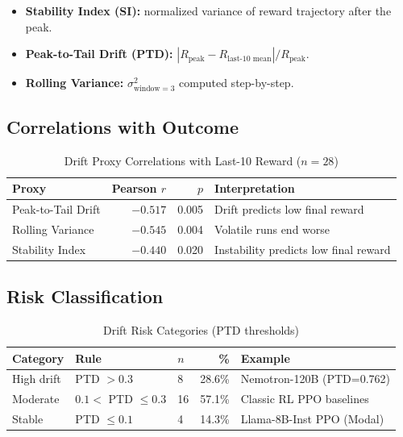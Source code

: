 \documentclass[12pt,a4paper]{report}
\theoremstyle{definition}
\begin{document}
\begin{itemize}[nosep]
\item \textbf{Stability Index (SI):} normalized variance of reward trajectory after the peak.
\item \textbf{Peak-to-Tail Drift (PTD):} $|R_{\text{peak}} - R_{\text{last-10 mean}}| / R_{\text{peak}}$.
\item \textbf{Rolling Variance:} $\sigma^2_{\text{window}=3}$ computed step-by-step.
\end{itemize}

\subsection{Correlations with Outcome}

\begin{table}[htbp]
\centering
\caption{Drift Proxy Correlations with Last-10 Reward ($n=28$)}
\label{tab:drift-corr}
\begin{tabular}{lrrl}
\toprule
\textbf{Proxy} & \textbf{Pearson $r$} & \textbf{$p$} & \textbf{Interpretation} \\
\midrule
Peak-to-Tail Drift & $-0.517$ & 0.005 & Drift predicts low final reward \\
Rolling Variance   & $-0.545$ & 0.004 & Volatile runs end worse \\
Stability Index    & $-0.440$ & 0.020 & Instability predicts low final reward \\
\bottomrule
\end{tabular}
\end{table}

\subsection{Risk Classification}

\begin{table}[htbp]
\centering
\caption{Drift Risk Categories (PTD thresholds)}
\label{tab:drift-risk}
\begin{tabular}{lllrl}
\toprule
\textbf{Category} & \textbf{Rule} & \textbf{$n$} & \textbf{\%} & \textbf{Example} \\
\midrule
High drift & PTD $> 0.3$   & 8 & 28.6\% & Nemotron-120B (PTD=0.762) \\
Moderate   & $0.1 <$ PTD $\le 0.3$ & 16 & 57.1\% & Classic RL PPO baselines \\
Stable     & PTD $\le 0.1$ & 4  & 14.3\% & Llama-8B-Inst PPO (Modal) \\
\bottomrule
\end{tabular}
\end{table}
\end{document}
